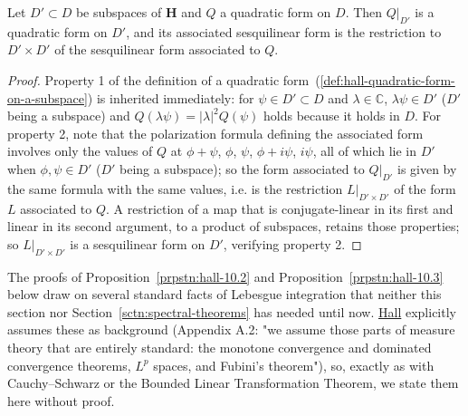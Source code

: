 \begin{lemma}
    \label{lmm:restriction-of-quadratic-form}
    \leanok
    Let $D' \subset D$ be subspaces of $\mathbf{H}$ and $Q$ a quadratic form on $D$. Then $Q\vert_{D'}$ is a quadratic form on $D'$, and its associated sesquilinear form is the restriction to $D' \times D'$ of the sesquilinear form associated to $Q$.
\end{lemma}
\begin{proof}
    \leanok
Property 1 of the definition of a quadratic form~(\ref{def:hall-quadratic-form-on-a-subspace}) is inherited immediately: for $\psi \in D' \subset D$ and $\lambda \in \mathbb{C}$, $\lambda\psi \in D'$ ($D'$ being a subspace) and $Q(\lambda\psi) = \lvert\lambda\rvert^2 Q(\psi)$ holds because it holds in $D$. For property 2, note that the polarization formula defining the associated form involves only the values of $Q$ at $\phi+\psi$, $\phi$, $\psi$, $\phi+i\psi$, $i\psi$, all of which lie in $D'$ when $\phi,\psi \in D'$ ($D'$ being a subspace); so the form associated to $Q\vert_{D'}$ is given by the same formula with the same values, i.e. is the restriction $L\vert_{D'\times D'}$ of the form $L$ associated to $Q$. A restriction of a map that is conjugate-linear in its first and linear in its second argument, to a product of subspaces, retains those properties; so $L\vert_{D'\times D'}$ is a sesquilinear form on $D'$, verifying property 2.
\end{proof}

The proofs of Proposition~\ref{prpstn:hall-10.2} and Proposition~\ref{prpstn:hall-10.3} below draw on several standard facts of Lebesgue integration that neither this section nor Section~\ref{sctn:spectral-theorems} has needed until now. \href{https://doi.org/10.1007/978-1-4614-7116-5}{Hall} explicitly assumes these as background (Appendix A.2: "we assume those parts of measure theory that are entirely standard: the monotone convergence and dominated convergence theorems, $L^p$ spaces, and Fubini's theorem"), so, exactly as with Cauchy–Schwarz or the Bounded Linear Transformation Theorem, we state them here without proof.

